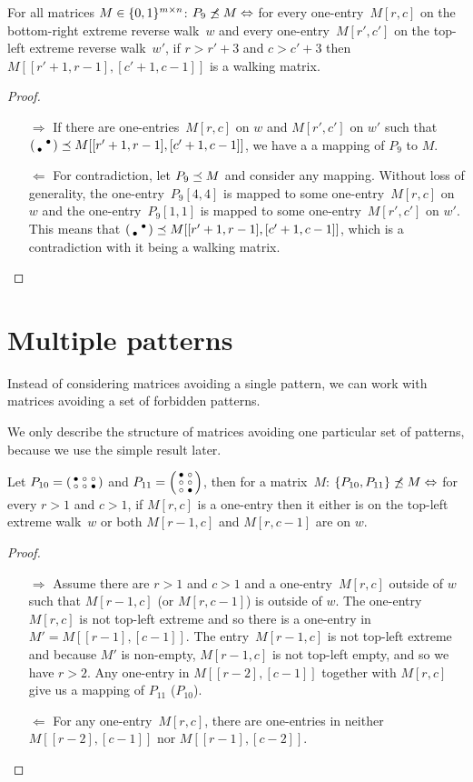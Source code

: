 \begin{prop}
For all matrices $M\in\{0,1\}^{m\times n}$: $P_9\not\preceq M\Leftrightarrow$ for every one-entry~$M[r,c]$ on the bottom-right extreme reverse walk~$w$ and every one-entry~$M[r',c']$ on the top-left extreme reverse walk~$w'$, if $r>r'+3$ and $c>c'+3$ then $M[[r'+1,r-1],[c'+1,c-1]]$ is a walking matrix.
\end{prop}
\begin{proof}
\begin{itemize}
	\item[$\Rightarrow$] If there are one-entries~$M[r,c]$ on $w$ and $M[r',c']$ on $w'$ such that $\left(\begin{smallmatrix} &\bullet\\\bullet& \end{smallmatrix}\right)\preceq M[[r'+1,r-1],[c'+1,c-1]]$, we have a a mapping of $P_9$ to $M$.
	\item[$\Leftarrow$] For contradiction, let $P_9\preceq M$ and consider any mapping. Without loss of generality, the one-entry~$P_9[4,4]$ is mapped to some one-entry~$M[r,c]$ on $w$ and the one-entry~$P_9[1,1]$ is mapped to some one-entry~$M[r',c']$ on $w'$. This means that $\left(\begin{smallmatrix} &\bullet\\\bullet& \end{smallmatrix}\right)\preceq M[[r'+1,r-1],[c'+1,c-1]]$, which is a contradiction with it being a walking matrix. \qedhere
\end{itemize}
\end{proof}

\section{Multiple patterns}
Instead of considering matrices avoiding a single pattern, we can work with matrices avoiding a set of forbidden patterns.

We only describe the structure of matrices avoiding one particular set of patterns, because we use the simple result later.

\begin{prop}
\label{prop:twopatterns}
Let $P_{10}=\left(\begin{smallmatrix}\bullet&\circ&\circ\\\circ&\circ&\bullet\end{smallmatrix}\right)$ and $P_{11}=\left(\begin{smallmatrix}\bullet&\circ\\\circ&\circ\\\circ&\bullet\end{smallmatrix}\right)$, then for a matrix~$M$: $\{P_{10},P_{11}\}\not\preceq M\Leftrightarrow$ for every $r>1$ and $c>1$, if $M[r,c]$ is a one-entry then it either is on the top-left extreme walk~$w$ or both $M[r-1,c]$ and $M[r,c-1]$ are on $w$.
\end{prop}
\begin{proof}
\begin{itemize}
	\item[$\Rightarrow$] Assume there are $r>1$ and $c>1$ and a one-entry~$M[r,c]$ outside of $w$ such that $M[r-1,c]$ (or $M[r,c-1]$) is outside of $w$. The one-entry~$M[r,c]$ is not top-left extreme and so there is a one-entry in $M'=M[[r-1],[c-1]]$. The entry~$M[r-1,c]$ is not top-left extreme and because $M'$ is non-empty, $M[r-1,c]$ is not top-left empty, and so we have $r>2$. Any one-entry in $M[[r-2],[c-1]]$ together with $M[r,c]$ give us a mapping of $P_{11}$ ($P_{10}$).
	\item[$\Leftarrow$] For any one-entry~$M[r,c]$, there are one-entries in neither $M[[r-2],[c-1]]$ nor $M[[r-1],[c-2]]$. \qedhere
\end{itemize}
\end{proof}
